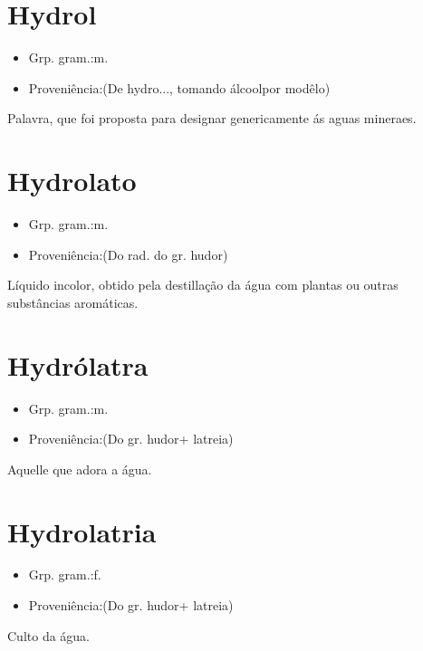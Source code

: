 \documentclass{article}
\begin{document}
\section{Hydrol}
\begin{itemize}
\item {Grp. gram.:m.}
\end{itemize}
\begin{itemize}
\item {Proveniência:(De \textunderscore hydro...\textunderscore , tomando \textunderscore álcool\textunderscore  por modêlo)}
\end{itemize}
Palavra, que foi proposta para designar genericamente ás aguas mineraes.
\section{Hydrolato}
\begin{itemize}
\item {Grp. gram.:m.}
\end{itemize}
\begin{itemize}
\item {Proveniência:(Do rad. do gr. \textunderscore hudor\textunderscore )}
\end{itemize}
Líquido incolor, obtido pela destillação da água com plantas ou outras substâncias aromáticas.
\section{Hydrólatra}
\begin{itemize}
\item {Grp. gram.:m.}
\end{itemize}
\begin{itemize}
\item {Proveniência:(Do gr. \textunderscore hudor\textunderscore  + \textunderscore latreia\textunderscore )}
\end{itemize}
Aquelle que adora a água.
\section{Hydrolatria}
\begin{itemize}
\item {Grp. gram.:f.}
\end{itemize}
\begin{itemize}
\item {Proveniência:(Do gr. \textunderscore hudor\textunderscore  + \textunderscore latreia\textunderscore )}
\end{itemize}
Culto da água.
\end{document}
